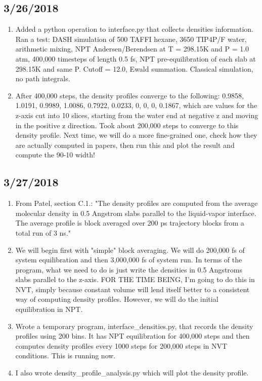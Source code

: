 \documentclass[12pt,reqno]{amsart}
\numberwithin{equation}{section}
\begin{document}
\begin{enumerate}
\end{enumerate}

\subsection{3/26/2018}
\begin{enumerate}
\item Added a python operation to interface.py that collects densities information.  Ran a test: DASH simulation of 500 TAFFI hexane, 3650 TIP4P/F water, arithmetic mixing, NPT Andersen/Berendsen at T = 298.15K and P = 1.0 atm, 400,000 timesteps of length 0.5 fs, NPT pre-equilibration of each slab at 298.15K and same P.  Cutoff = 12.0, Ewald summation.  Classical simulation, no path integrals.  
\item After 400,000 steps, the density profiles converge to the following: 0.9858, 1.0191, 0.9989, 1.0086, 0.7922, 0.0233, 0, 0, 0, 0.1867, which are values for the z-axis cut into 10 slices, starting from the water end at negative z and moving in the positive z direction.  Took about 200,000 steps to converge to this density profile.  Next time, we will do a more fine-grained one, check how they are actually computed in papers, then run this and plot the result and compute the 90-10 width! 
\end{enumerate}

\subsection{3/27/2018}
\begin{enumerate}
\item From Patel, section C.1.: "The density profiles are computed from the average molecular density in 0.5 Angstrom slabs parallel to the liquid-vapor interface.  The average profile is block averaged over 200 ps trajectory blocks from a total run of 3 ns."  
\item We will begin first with "simple" block averaging.  We will do 200,000 fs of system equilibration and then 3,000,000 fs of system run.  In terms of the program, what we need to do is just write the densities in 0.5 Angstroms slabs parallel to the z-axis.  FOR THE TIME BEING, I'm going to do this in NVT, simply because constant volume will lend itself better to a consistent way of computing density profiles.  However, we will do the initial equilibration in NPT.  
\item Wrote a temporary program, interface\_densities.py, that records the density profiles using 200 bins. It has NPT equilibration for 400,000 steps and then computes density profiles every 1000 steps for 200,000 steps in NVT conditions.  This is running now.
\item I also wrote density\_profile\_analysis.py which will plot the density profile. 
\end{enumerate}
\end{document}
